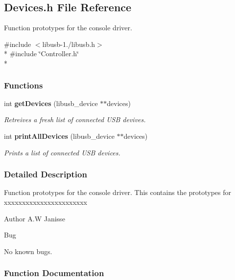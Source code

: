 \subsection{Devices.\-h File Reference}
\label{_devices_8h}


Function prototypes for the console driver.  


{\ttfamily \#include $<$libusb-\/1./libusb.\-h$>$}\\*
{\ttfamily \#include \char`\"{}Controller.\-h\char`\"{}}\\*
\subsubsection*{Functions}
\begin{DoxyCompactItemize}
\item 
int {\bf get\-Devices} (libusb\-\_\-device $\ast$$\ast$devices)
\begin{DoxyCompactList}\small\item\em Retreives a fresh list of connected U\-S\-B devives. \end{DoxyCompactList}\item 
int {\bf print\-All\-Devices} (libusb\-\_\-device $\ast$$\ast$devices)
\begin{DoxyCompactList}\small\item\em Prints a list of connected U\-S\-B devices. \end{DoxyCompactList}\end{DoxyCompactItemize}


\subsubsection{Detailed Description}
Function prototypes for the console driver. This contains the prototypes for xxxxxxxxxxxxxxxxxxxxxxx

\begin{DoxyAuthor}{Author}
A.\-W Janisse 
\end{DoxyAuthor}
\begin{DoxyRefDesc}{Bug}
\item[{\bf Bug}]No known bugs. \end{DoxyRefDesc}


\subsubsection{Function Documentation}
